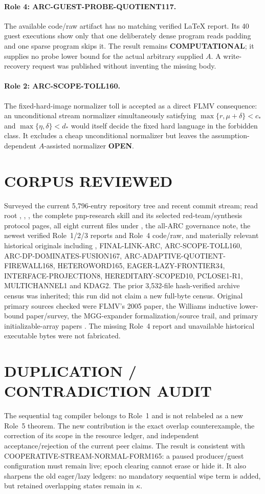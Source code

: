 \documentclass[11pt]{article}
\newcommand{\OPEN}{\textbf{OPEN}}
\begin{document}
\paragraph{Role 4: ARC-GUEST-PROBE-QUOTIENT117.}
The available code/raw artifact has no matching verified LaTeX report.  Its 40
guest executions show only that one deliberately dense program reads padding
and one sparse program skips it.  The result remains \textbf{COMPUTATIONAL};
it supplies no probe lower bound for the actual arbitrary supplied $A$.  A
write-recovery request was published without inventing the missing body.

\paragraph{Role 2: ARC-SCOPE-TOLL160.}
The fixed-hard-image normalizer toll is accepted as a direct FLMV consequence:
an unconditional stream normalizer simultaneously satisfying
$\max\{r,\mu+\delta\}<c_*$ and
$\max\{\eta,\delta\}<d_*$ would itself decide the fixed hard language in the
forbidden class.  It excludes a cheap unconditional normalizer but leaves the
assumption-dependent $A$-assisted normalizer \OPEN.

\section{CORPUS REVIEWED}
Surveyed the current 5,796-entry repository tree and recent commit stream;
read root , , , the complete
pnp-research skill and its selected red-team/synthesis protocol pages, all
eight current files under , the all-ARC governance note, the
newest verified Role~1/2/3 reports and Role~4 code/raw, and materially relevant
historical originals including , FINAL-LINK-ARC,
ARC-SCOPE-TOLL160, ARC-DP-DOMINATES-FUSION167,
ARC-ADAPTIVE-QUOTIENT-FIREWALL168, HETEROWORD165,
EAGER-LAZY-FRONTIER34, INTERFACE-PROJECTION8,
HEREDITARY-SCOPED10, PCLOSE1-R1, MULTICHANNEL1 and KDAG2.  The prior
3,532-file hash-verified archive census was inherited; this run did not claim
a new full-byte census.  Original primary sources checked were FLMV's 2005
paper, the Williams inductive lower-bound paper/survey, the MGG-expander
formalization/source trail, and primary initializable-array papers
\cite{flmv,williams,katoh,navarro}.  The missing Role~4 report and unavailable
historical executable bytes were not fabricated.

\section{DUPLICATION / CONTRADICTION AUDIT}
The sequential tag compiler belongs to Role~1 and is not relabeled as a new
Role~5 theorem.  The new contribution is the exact overlap counterexample,
the correction of its scope in the resource ledger, and independent
acceptance/rejection of the current peer claims.  The result is consistent
with COOPERATIVE-STREAM-NORMAL-FORM165: a paused producer/guest configuration
must remain live; epoch clearing cannot erase or hide it.  It also sharpens
the old eager/lazy ledgers: no mandatory sequential wipe term is added, but
retained overlapping states remain in $\kappa$.
\end{document}
